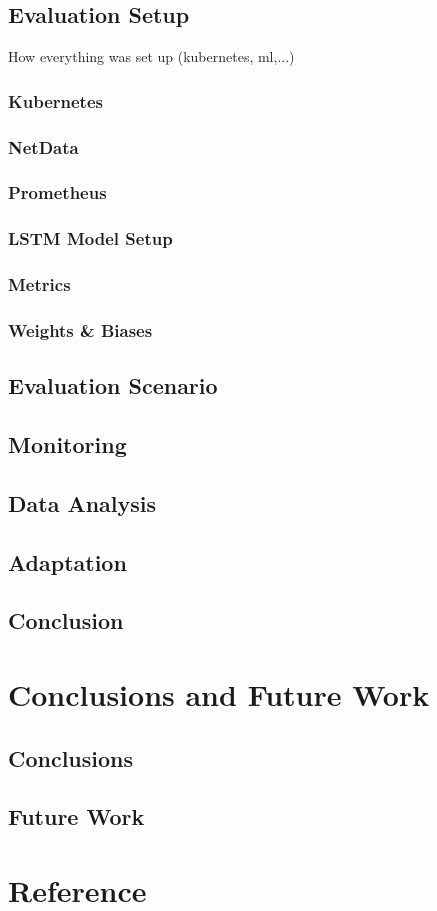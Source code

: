 \documentclass{report}
\begin{document}
    \section{Evaluation Setup}
      How everything was set up (kubernetes, ml,...)
      \subsection{Kubernetes}
      \subsection{NetData}
      \subsection{Prometheus}
      \subsection{LSTM Model Setup}
      \subsection{Metrics}
      \subsection{Weights \& Biases}
    \section{Evaluation Scenario}
    \section{Monitoring}
    \section{Data Analysis}
    \section{Adaptation}
    \section{Conclusion}

  \chapter{Conclusions and Future Work}

    \section{Conclusions}
    \section{Future Work}

  \chapter{Reference}
\end{document}
